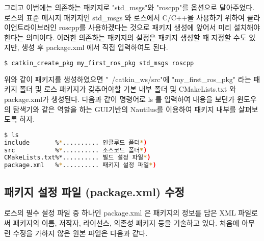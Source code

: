 그리고 이번에는 의존하는 패키지로 "std\_msgs"와 "roscpp"를 옵션으로 달아주었다. 로스의 표준 메시지 패키지인 std\_msgs 와 로스에서 C/C++을 사용하기 위하여 클라이언트라이브러인 roscpp를 사용하겠다는 것으로 패키지 생성에 앞어서 미리 설치해야한다는 의미이다. 이러한 의존하는 패키지의 설정은 패키지 생성할 때 지정할 수도 있지만, 생성 후 package.xml 에서 직접 입력하여도 된다.

\begin{lstlisting}[language=bash]
$ catkin_create_pkg my_first_ros_pkg std_msgs roscpp
\end{lstlisting}

위와 같이 패키지를 생성하였으면 "~/catkin\_ws/src"에 "my\_first\_ros\_pkg" 라는 패키지 폴더 및 로스 패키지가 갖추어야할 기본 내부 폴더 및 CMakeLists.txt 와 package.xml가 생성된다. 다음과 같이 명령어로 ls 를 입력하여 내용을 보던가 윈도우의 탐색기와 같은 역할을 하는 GUI기반의 Nautilus를 이용하여 패키지 내부를 살펴보도록 하자.

\begin{lstlisting}[language=bash]
$ ls
include       %*.......... 인클루드 폴더*)
src           %*.......... 소스코드 폴더*)
CMakeLists.txt%*.......... 빌드 설정 파일*)
package.xml   %*.......... 패키지 설정 파일*)
\end{lstlisting}

\subsection{패키지 설정 파일 (package.xml) 수정}

로스의 필수 설정 파일 중 하나인 package.xml 은 패키지의 정보를 담은 XML 파일로써 패키지의 이름, 저작자, 라이선스, 의존성 패키지 등을 기술하고 있다. 처음에 아무런 수정을 가하지 않은 원본 파일은 다음과 같다.



